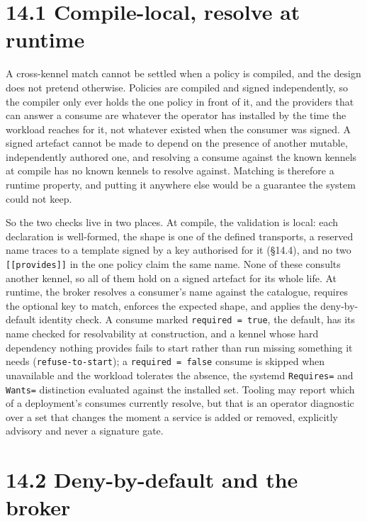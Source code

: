 \hypertarget{compile-local-resolve-at-runtime}{%
\section{14.1 Compile-local, resolve at
runtime}\label{compile-local-resolve-at-runtime}}

A cross-kennel match cannot be settled when a policy is compiled, and
the design does not pretend otherwise. Policies are compiled and signed
independently, so the compiler only ever holds the one policy in front
of it, and the providers that can answer a consume are whatever the
operator has installed by the time the workload reaches for it, not
whatever existed when the consumer was signed. A signed artefact cannot
be made to depend on the presence of another mutable, independently
authored one, and resolving a consume against the known kennels at
compile has no known kennels to resolve against. Matching is therefore a
runtime property, and putting it anywhere else would be a guarantee the
system could not keep.

So the two checks live in two places. At compile, the validation is
local: each declaration is well-formed, the shape is one of the defined
transports, a reserved name traces to a template signed by a key
authorised for it (§14.4), and no two \texttt{{[}{[}provides{]}{]}} in
the one policy claim the same name. None of these consults another
kennel, so all of them hold on a signed artefact for its whole life. At
runtime, the broker resolves a consumer's name against the catalogue,
requires the optional key to match, enforces the expected shape, and
applies the deny-by-default identity check. A consume marked
\texttt{required\ =\ true}, the default, has its name checked for
resolvability at construction, and a kennel whose hard dependency
nothing provides fails to start rather than run missing something it
needs (\texttt{refuse-to-start}); a \texttt{required\ =\ false} consume
is skipped when unavailable and the workload tolerates the absence, the
systemd \texttt{Requires=} and \texttt{Wants=} distinction evaluated
against the installed set. Tooling may report which of a deployment's
consumes currently resolve, but that is an operator diagnostic over a
set that changes the moment a service is added or removed, explicitly
advisory and never a signature gate.

\hypertarget{deny-by-default-and-the-broker}{%
\section{14.2 Deny-by-default and the
broker}\label{deny-by-default-and-the-broker}}

